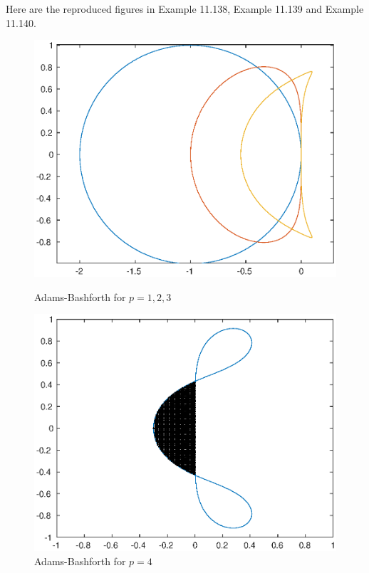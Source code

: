 \documentclass[twoside,a4paper]{article}
\begin{document}
\;\;\;\; Here are the reproduced figures in Example 11.138, Example 11.139 and Example 11.140.
\begin{figure}[H]
    \centering
    \begin{minipage}[t]{0.4\linewidth}
        \centering
        \includegraphics[width=0.9\linewidth]{figure/ex-11-138-1.eps}
        \caption*{Adams-Bashforth for $p=1,2,3$}
    \end{minipage}
    \hspace{1em}
    \begin{minipage}[t]{0.4\linewidth}
      \centering
      \includegraphics[width=0.9\linewidth]{figure/ex-11-138-2.eps}
      \caption*{Adams-Bashforth for $p=4$}
    \end{minipage}
    \begin{minipage}[t]{0.4\linewidth}

\end{minipage}
\end{figure}
\end{document}
